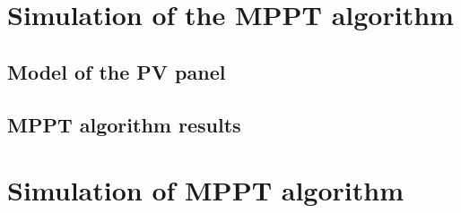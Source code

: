 
\section{Simulation of the MPPT algorithm} \label{MPPTSimulation}
\subsection{Model of the PV panel}
\subsection{MPPT algorithm results}

\section{Simulation of MPPT algorithm}\label{MPPTSimulation}

